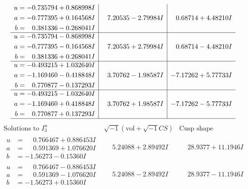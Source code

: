 \documentclass[1p]{elsarticle_modified}
\theoremstyle{definition}
\newcommand{\I}{\sqrt{-1}}
\begin{document}
$$\begin{array}{c|c|c}
\begin{aligned}
u &= -0.735794 + 0.868998 I \\
a &= -0.777395 + 0.164568 I \\
b &= \phantom{-}0.381336 - 0.268041 I\end{aligned}
 & \phantom{-}7.20535 - 2.79984 I & \phantom{-}0.68714 + 4.48210 I \\ \hline\begin{aligned}
u &= -0.735794 - 0.868998 I \\
a &= -0.777395 - 0.164568 I \\
b &= \phantom{-}0.381336 + 0.268041 I\end{aligned}
 & \phantom{-}7.20535 + 2.79984 I & \phantom{-}0.68714 - 4.48210 I \\ \hline\begin{aligned}
u &= -0.493215 + 1.032640 I \\
a &= -1.169460 - 0.418848 I \\
b &= \phantom{-}0.770877 - 0.137293 I\end{aligned}
 & \phantom{-}3.70762 - 1.98587 I & -7.17262 + 5.77733 I \\ \hline\begin{aligned}
u &= -0.493215 - 1.032640 I \\
a &= -1.169460 + 0.418848 I \\
b &= \phantom{-}0.770877 + 0.137293 I\end{aligned}
 & \phantom{-}3.70762 + 1.98587 I & -7.17262 - 5.77733 I\\
 \hline 
 \end{array}$$\newpage$$\begin{array}{c|c|c}  
\text{Solutions to }I^u_{3}& \I (\text{vol} + \sqrt{-1}CS) & \text{Cusp shape}\\
 \hline 
\begin{aligned}
u &= \phantom{-}0.766467 + 0.886453 I \\
a &= \phantom{-}0.591369 + 1.076620 I \\
b &= -1.56273 - 0.15360 I\end{aligned}
 & \phantom{-}5.24088 + 2.89492 I & \phantom{-}28.9377 + 11.1946 I \\ \hline\begin{aligned}
u &= \phantom{-}0.766467 - 0.886453 I \\
a &= \phantom{-}0.591369 - 1.076620 I \\
b &= -1.56273 + 0.15360 I\end{aligned}
 & \phantom{-}5.24088 - 2.89492 I & \phantom{-}28.9377 - 11.1946 I \\ \hline\begin{aligned}

\end{aligned}
\end{array}$$
\end{document}
